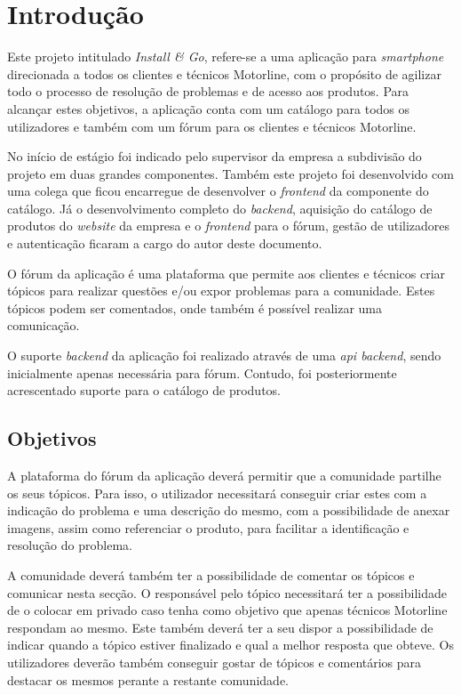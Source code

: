 
\chapter{Introdução}
Este projeto intitulado \textit{Install \& Go}, refere-se a uma aplicação para \textit{smartphone} direcionada a todos os clientes e 
técnicos Motorline, com o propósito de agilizar todo o processo de resolução de problemas e de acesso 
aos produtos. Para alcançar estes objetivos, a aplicação conta com um catálogo para todos os utilizadores 
e também com um fórum para os clientes e técnicos Motorline.

No início de estágio foi indicado pelo supervisor da empresa a subdivisão do projeto em duas grandes componentes. Também este projeto foi desenvolvido com uma colega que ficou encarregue de desenvolver o \textit{frontend} da componente do catálogo. Já o desenvolvimento completo do \textit{backend}, aquisição do catálogo de produtos do \textit{website} da empresa e o \textit{frontend} para o fórum, gestão de utilizadores e autenticação ficaram a cargo do autor deste documento.

O fórum da aplicação é uma plataforma que permite aos clientes e técnicos criar tópicos para realizar questões e/ou expor problemas para a comunidade. Estes tópicos podem ser comentados, onde também é possível realizar uma comunicação.

O suporte \textit{backend} da aplicação foi realizado através de uma \textit{api backend}, sendo inicialmente apenas necessária para fórum. Contudo, foi posteriormente acrescentado suporte para o catálogo de produtos.

\newpage

\section{Objetivos}
A plataforma do fórum da aplicação deverá permitir que a comunidade partilhe os seus tópicos. Para isso, o utilizador necessitará conseguir criar estes com a indicação do problema e uma descrição do mesmo, com a possibilidade de anexar imagens, assim como referenciar o produto, para facilitar a identificação e resolução do problema.

A comunidade deverá também ter a possibilidade de comentar os tópicos e comunicar nesta secção. O responsável pelo tópico necessitará ter a possibilidade de o colocar em privado caso tenha como objetivo que apenas técnicos Motorline respondam ao mesmo. Este também deverá ter a seu dispor a possibilidade de indicar quando a tópico estiver finalizado e qual a melhor resposta que obteve. Os utilizadores deverão também conseguir gostar de tópicos e comentários para destacar os mesmos perante a restante comunidade.

